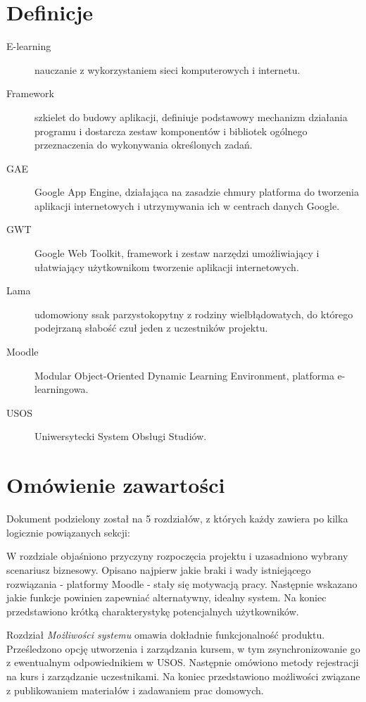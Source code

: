 \documentclass{pracamgr}
\begin{document}
\section{Definicje}
\begin{description}
   \item[E-learning]
      nauczanie z wykorzystaniem sieci komputerowych i internetu.
   \item[Framework]
      szkielet do budowy aplikacji, definiuje podstawowy mechanizm działania
      programu i dostarcza zestaw komponentów i bibliotek ogólnego
      przeznaczenia do wykonywania określonych zadań. 
   \item[GAE]
      Google App Engine, działająca na zasadzie chmury platforma do tworzenia 
      aplikacji internetowych i utrzymywania ich w centrach danych Google.
   \item[GWT]
      Google Web Toolkit, framework i zestaw narzędzi umożliwiający 
      i ułatwiający użytkownikom tworzenie aplikacji internetowych.
   \item[Lama]
      udomowiony ssak parzystokopytny z rodziny wielbłądowatych, do którego
      podejrzaną słabość czuł jeden z uczestników projektu.
   \item[Moodle]
      Modular Object-Oriented Dynamic Learning Environment, platforma 
      e-learningowa. 
   \item[USOS]
      Uniwersytecki System Obsługi Studiów.
\end{description}

%
%
\section{Omówienie zawartości}

Dokument podzielony został na 5 rozdziałów, z których każdy zawiera po kilka
logicznie powiązanych sekcji:

W rozdziale \emph{ } objaśniono przyczyny rozpoczęcia projektu i
uzasadniono wybrany scenariusz biznesowy. Opisano najpierw jakie braki i wady 
istniejącego rozwiązania - platformy Moodle - stały się motywacją pracy. 
Następnie wskazano jakie funkcje powinien zapewniać alternatywny, idealny
system. Na koniec przedstawiono krótką charakterystykę potencjalnych użytkowników.

Rozdział \emph{Możliwości systemu} omawia dokładnie funkcjonalność produktu. 
Prześledzono opcję utworzenia i zarządzania kursem, w tym zsynchronizowanie 
go z ewentualnym odpowiednikiem w USOS. Następnie omówiono metody rejestracji
na kurs i zarządzanie uczestnikami. Na koniec przedstawiono możliwości 
związane z publikowaniem materiałów i zadawaniem prac domowych.
\end{document}
